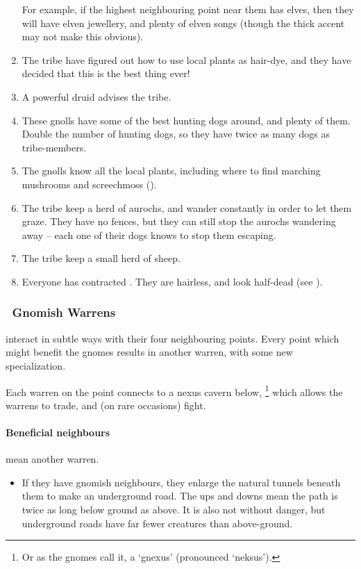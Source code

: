 \begin{multicols}{2}
\begin{enumerate}
  For example, if the highest neighbouring point near them has elves, then they will have elven jewellery, and plenty of elven songs (though the thick accent may not make this obvious).
  \item
  The tribe have figured out how to use local plants as hair-dye, and they have decided that this is the best thing ever!
  \index[Dye]
  \item
  A powerful druid advises the tribe.
  \item
  These gnolls have some of the best hunting dogs around, and plenty of them.
  Double the number of hunting dogs, so they have twice as many dogs as tribe-members.
  \item
  The gnolls know all the local plants, including where to find marching mushrooms and screechmoss ().
  \item
  The tribe keep a herd of aurochs, and wander constantly in order to let them graze.
  They have no fences, but they can still stop the aurochs wandering away -- each one of their dogs knows to stop them escaping.
  \item
  The tribe keep a small herd of sheep.
  \item
  Everyone has contracted .
  They are hairless, and look half-dead
  (see ).
\end{enumerate}

\subsubsection[Gnomish Warrens]{\Gn\ Gnomish Warrens}
\label{gnomePoint}
interact in subtle ways with their four neighbouring points.
Every point which might benefit the gnomes results in another warren, with some new specialization.

Each warren on the point connects to a nexus cavern below,%
\footnote{Or as the gnomes call it, a `gnexus' (pronounced `neksus').}
which allows the warrens to trade, and (on rare occasions) fight.

\paragraph{Beneficial neighbours}
mean another warren.

\begin{itemize}
  \item
  If they have gnomish neighbours, they enlarge the natural tunnels beneath them to make an underground road.
  The ups and downs mean the path is twice as long below ground as above.
  It is also not without danger, but underground roads have far fewer creatures than above-ground.


\end{itemize}
\end{multicols}
